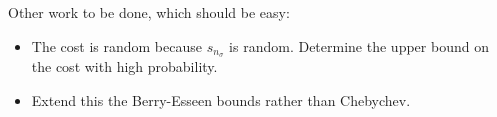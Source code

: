 \documentclass{amsart}
\begin{document}
Other work to be done, which should be easy:
\begin{itemize}
	\item The cost is random because $s_{n_\sigma}$ is random.  Determine the upper bound on the cost with high probability.  
	\item Extend this the Berry-Esseen bounds rather than Chebychev.
\end{itemize}




\end{document}
